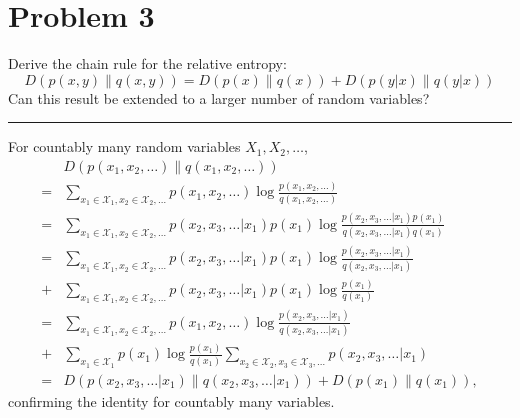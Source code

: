 \documentclass{article}
\newcommand{\horline}
           {\begin{center}
              \noindent\rule{8cm}{0.4pt}
            \end{center}}
\begin{document}
\section*{Problem 3}
Derive the chain rule for the relative entropy:
$$D(p(x,y) \| q(x,y)) = D(p(x) \| q(x)) + D(p(y|x) \| q(y|x))$$
Can this result be extended to a larger number of random variables?
\horline
For countably many random variables $X_1, X_2, \dots$,
\begin{align*}
&D(p(x_1, x_2, \dots) \| q(x_1, x_2, \dots)) \\
  =& \sum_{x_1 \in \mathcal{X}_1, x_2 \in \mathcal{X}_2, \dots}
    p(x_1, x_2, \dots) \log \frac{p(x_1, x_2, \dots)}{q(x_1, x_2, \dots)}\\
  =& \sum_{x_1 \in \mathcal{X}_1, x_2 \in \mathcal{X}_2, \dots}
     p(x_2, x_3, \dots | x_1) p(x_1) 
       \log \frac{p(x_2, x_3, \dots | x_1)p(x_1)}
                 {q(x_2, x_3, \dots | x_1)q(x_1)} \\
  =& \sum_{x_1 \in \mathcal{X}_1, x_2 \in \mathcal{X}_2, \dots}
     p(x_2, x_3, \dots | x_1) p(x_1) 
       \log \frac{p(x_2, x_3, \dots | x_1)}
                 {q(x_2, x_3, \dots | x_1)} \\
  +& \sum_{x_1 \in \mathcal{X}_1, x_2 \in \mathcal{X}_2, \dots}
     p(x_2, x_3, \dots | x_1) p(x_1) 
       \log \frac{p(x_1)}{q(x_1)} \\
  =& \sum_{x_1 \in \mathcal{X}_1, x_2 \in \mathcal{X}_2, \dots}
       p(x_1, x_2, \dots) \log 
       \frac{p(x_2, x_3, \dots | x_1)}{q(x_2, x_3, \dots | x_1)}\\
  +& \sum_{x_1 \in \mathcal{X}_1} p(x_1) \log \frac{p(x_1)}{q(x_1)} 
       \sum_{x_2 \in \mathcal{X}_2, x_3 \in \mathcal{X}_3, \dots} 
         p(x_2, x_3, \dots | x_1) \\
  =&  D(p(x_2, x_3, \dots | x_1) 
    \| q(x_2, x_3, \dots | x_1)) + D(p(x_1) \| q(x_1)),
\end{align*}
confirming the identity for countably many variables.
\end{document}
